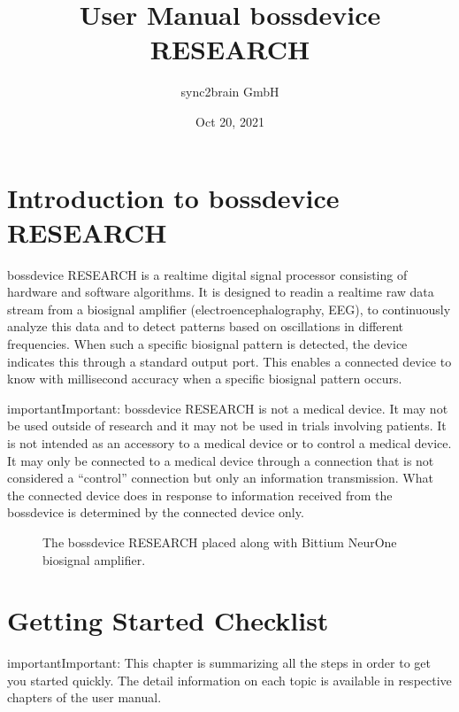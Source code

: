 \documentclass[letterpaper,10pt,english]{sphinxmanual}
\title{User Manual \sphinxhyphen{} bossdevice RESEARCH}
\date{Oct 20, 2021}
\author{sync2brain GmbH}
\begin{document}
\pagestyle{empty}
\sphinxmaketitle
\pagestyle{plain}
\sphinxtableofcontents
\pagestyle{normal}
\label{\detokenize{index::doc}}



\chapter{Introduction to bossdevice RESEARCH}
\label{\detokenize{1_introduction_to_bossdevice_research:introduction-to-bossdevice-research}}\label{\detokenize{1_introduction_to_bossdevice_research::doc}}
\sphinxAtStartPar
bossdevice RESEARCH is a real\sphinxhyphen{}time digital signal processor consisting of hardware and software algorithms. It is designed to read\sphinxhyphen{}in a real\sphinxhyphen{}time raw data stream from a biosignal amplifier (electroencephalography, EEG), to continuously analyze this data and to detect patterns based on oscillations in different frequencies. When such a specific bio\sphinxhyphen{}signal pattern is detected, the device indicates this through a standard output port. This enables a connected device to know with millisecond accuracy when a specific bio\sphinxhyphen{}signal pattern occurs.

\begin{sphinxadmonition}{important}{Important:}
\sphinxAtStartPar
bossdevice RESEARCH is not a medical device. It may not be used outside of research
and it may not be used in trials involving patients. It is not intended as an accessory
to a medical device or to control a medical device. It may only be connected to a
medical device through a connection that is not considered a “control” connection
but only an information transmission. What the connected device does in response
to information received from the bossdevice is determined by the connected device
only.
\end{sphinxadmonition}

\begin{figure}[htbp]
\centering
\capstart

\noindent{}
\caption{The bossdevice RESEARCH placed along with Bittium NeurOne biosignal amplifier.}\label{\detokenize{1_introduction_to_bossdevice_research:id1}}\end{figure}


\chapter{Getting Started \sphinxhyphen{} Checklist}
\label{\detokenize{1b_GettingStartedCheckList:getting-started-checklist}}\label{\detokenize{1b_GettingStartedCheckList::doc}}
\begin{sphinxadmonition}{important}{Important:}
\sphinxAtStartPar
This chapter is summarizing all the steps in order to get you started quickly. The detail information on each topic is available in respective chapters of the user manual.
\end{sphinxadmonition}
\end{document}
